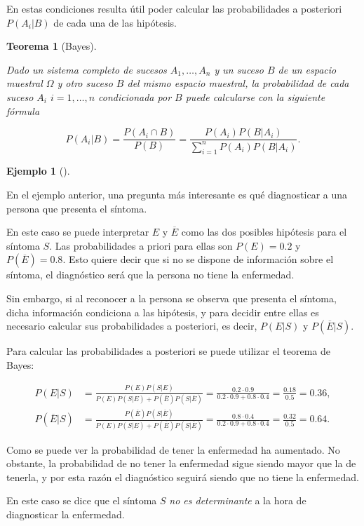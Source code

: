 \documentclass[
  spanish,
  a4paper,
]{scrreport}
\theoremstyle{plain}
\newtheorem{theorem}{Teorema}[chapter]
\theoremstyle{definition}
\newtheorem{example}{Ejemplo}[chapter]
\theoremstyle{definition}
\theoremstyle{remark}
\begin{document}
En estas condiciones resulta útil poder calcular las probabilidades a
posteriori \(P(A_i|B)\) de cada una de las hipótesis.

\begin{theorem}[Bayes]\protect\hypertarget{thm-bayes}{}\label{thm-bayes}

Dado un sistema completo de sucesos \(A_1,\ldots,A_n\) y un suceso \(B\)
de un espacio muestral \(\Omega\) y otro suceso \(B\) del mismo espacio
muestral, la probabilidad de cada suceso \(A_i\) \(i=1,\ldots,n\)
condicionada por \(B\) puede calcularse con la siguiente fórmula

\[P(A_i|B) = \frac{P(A_i\cap B)}{P(B)} = \frac{P(A_i)P(B|A_i)}{\sum_{i=1}^n P(A_i)P(B|A_i)}.\]

\end{theorem}

\begin{example}[]\protect\hypertarget{exm-teorema-bayes}{}\label{exm-teorema-bayes}

En el ejemplo anterior, una pregunta más interesante es qué diagnosticar
a una persona que presenta el síntoma.

En este caso se puede interpretar \(E\) y \(\overline{E}\) como las dos
posibles hipótesis para el síntoma \(S\). Las probabilidades a priori
para ellas son \(P(E)=0.2\) y \(P(\overline E)=0.8\). Esto quiere decir
que si no se dispone de información sobre el síntoma, el diagnóstico
será que la persona no tiene la enfermedad.

Sin embargo, si al reconocer a la persona se observa que presenta el
síntoma, dicha información condiciona a las hipótesis, y para decidir
entre ellas es necesario calcular sus probabilidades a posteriori, es
decir, \(P(E|S)\) y \(P(\overline{E}|S)\).

Para calcular las probabilidades a posteriori se puede utilizar el
teorema de Bayes:

\begin{align*}
P(E|S) &= \frac{P(E)P(S|E)}{P(E)P(S|E)+P(\overline{E})P(S|\overline{E})} = \frac{0.2\cdot 0.9}{0.2\cdot 0.9 + 0.8\cdot 0.4} = \frac{0.18}{0.5}=0.36,\\
P(\overline{E}|S) &= \frac{P(\overline{E})P(S|\overline{E})}{P(E)P(S|E)+P(\overline{E})P(S|\overline{E})} = \frac{0.8\cdot 0.4}{0.2\cdot 0.9 + 0.8\cdot 0.4} = \frac{0.32}{0.5}=0.64.
\end{align*}

Como se puede ver la probabilidad de tener la enfermedad ha aumentado.
No obstante, la probabilidad de no tener la enfermedad sigue siendo
mayor que la de tenerla, y por esta razón el diagnóstico seguirá siendo
que no tiene la enfermedad.

En este caso se dice que el síntoma \(S\) \emph{no es determinante} a la
hora de diagnosticar la enfermedad.

\end{example}
\end{document}
